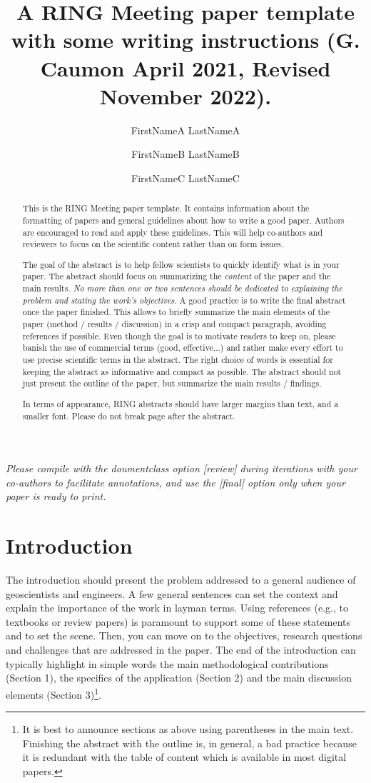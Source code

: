 \documentclass[final]{ring}
\title{A RING Meeting paper template with some writing instructions \newline (G. Caumon April 2021, Revised November 2022).}
\author[1]{FirstNameA LastNameA}
\author[2]{FirstNameB LastNameB}
\author[1,2]{FirstNameC LastNameC}
\affil[1]{RING, GeoRessources / ENSG, Université de Lorraine / CNRS, F-54000 Nancy}
\affil[2]{Team, Laboratory, Organization, Zip code, Country}
\begin{document}
\maketitle

\begin{abstract}

This is the RING Meeting paper template. It contains information about the formatting of papers and general guidelines about how to write a good paper. Authors are encouraged to read and apply these guidelines. This will help co-authors and reviewers to focus on the scientific content rather than on form issues. 

The goal of the abstract is to help fellow scientists to quickly identify what is in your paper. The abstract should focus on summarizing the \emph{content} of the paper and the main results. \emph{No more than one or two sentences should be dedicated to explaining the problem and stating the work’s objectives}. A good practice is to write the final abstract once the paper finished. This allows to briefly summarize the main elements of the paper (method / results / discussion) in a crisp and compact paragraph, avoiding references if possible. Even though the goal is to motivate readers to keep on, please banish the use of commercial terms (good, effective...) and rather make every effort to use precise scientific terms in the abstract. The right choice of words is essential for keeping the abstract as informative and compact as possible. The abstract should not just present the outline of the paper, but summarize the main results / findings. 

In terms of appearance, RING abstracts should have larger margins than text, and a smaller font. Please do not break page after the abstract.

\end{abstract}

\emph{Please compile with the doumentclass option [review] during iterations with your co-authors to facilitate annotations, and use the [final] option only when your paper is ready to print.}


\section*{Introduction}

The introduction should present the problem addressed to a general audience of geoscientists and engineers. A few general sentences can set the context and explain the importance of the work in layman terms. Using references (e.g., to textbooks or review papers) is paramount to support some of these statements and to set the scene. Then, you can move on to the objectives, research questions and challenges that are addressed in the paper. The end of the introduction can typically highlight in simple words the main methodological contributions (Section 1), the specifics of the application (Section 2) and the main discussion elements (Section 3)\footnote{It is best to announce sections as above using parentheses in the main text. Finishing the abstract with the outline is, in general, a bad practice because it is redundant with the table of content which is available in most digital papers.}.
\end{document}
